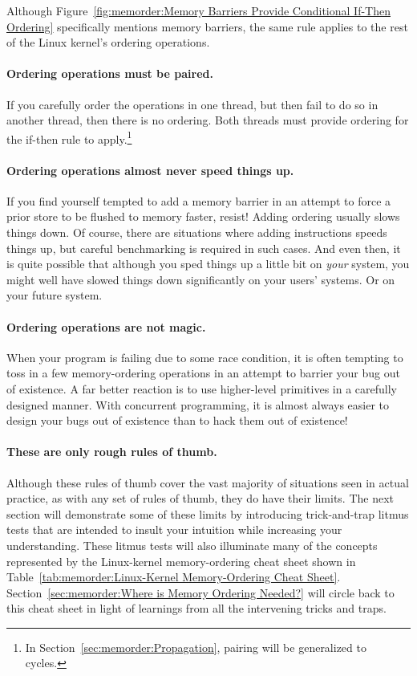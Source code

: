 Although
Figure~\ref{fig:memorder:Memory Barriers Provide Conditional If-Then Ordering}
specifically mentions memory barriers, the same rule applies to the
rest of the Linux kernel's ordering operations.

\paragraph{Ordering operations must be paired.}
If you carefully order the operations in one thread, but then fail to do
so in another thread, then there is no ordering.
Both threads must provide ordering for the if-then rule to apply.\footnote{
	In Section~\ref{sec:memorder:Propagation}, pairing will be
	generalized to cycles.}

\paragraph{Ordering operations almost never speed things up.}
If you find yourself tempted to add a memory barrier in an attempt
to force a prior store to be flushed to memory faster, resist!
Adding ordering usually slows things down.
Of course, there are situations where adding instructions speeds things
up, but careful benchmarking is required in such cases.
And even then, it is quite possible that although you sped things up
a little bit on \emph{your} system, you might well have slowed things
down significantly on your users' systems.
Or on your future system.

\paragraph{Ordering operations are not magic.}
When your program is failing due to some race condition, it is often
tempting to toss in a few memory-ordering operations in an attempt
to barrier your bug out of existence.
A far better reaction is to use higher-level primitives in a carefully
designed manner.
With concurrent programming, it is almost always easier to design
your bugs out of existence than to hack them out of existence!

\paragraph{These are only rough rules of thumb.}
Although these rules of thumb cover the vast majority of situations
seen in actual practice, as with any set of rules of thumb, they
do have their limits.
The next section will demonstrate some of these limits by introducing
trick-and-trap litmus tests that are intended to insult your
intuition while increasing your understanding.
These litmus tests will also illuminate many of the concepts
represented by the Linux-kernel memory-ordering cheat sheet shown in
Table~\ref{tab:memorder:Linux-Kernel Memory-Ordering Cheat Sheet}.
Section~\ref{sec:memorder:Where is Memory Ordering Needed?} will
circle back to this cheat sheet in light of learnings from all the
intervening tricks and traps.

